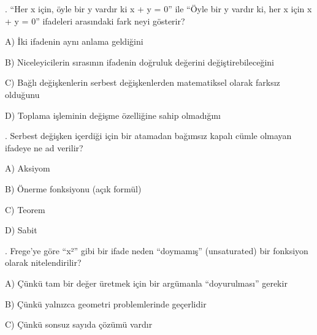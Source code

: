 \par\smallskip{}. “Her x için, öyle bir y vardır ki x + y = 0” ile “Öyle bir y vardır ki, her x için x + y = 0” ifadeleri arasındaki fark neyi gösterir?

\par\noindent\hspace*{1.6em}A) İki ifadenin aynı anlama geldiğini

\par\noindent\hspace*{1.6em}B) Niceleyicilerin sırasının ifadenin doğruluk değerini değiştirebileceğini

\par\noindent\hspace*{1.6em}C) Bağlı değişkenlerin serbest değişkenlerden matematiksel olarak farksız olduğunu

\par\noindent\hspace*{1.6em}D) Toplama işleminin değişme özelliğine sahip olmadığını

\par\smallskip{}. Serbest değişken içerdiği için bir atamadan bağımsız kapalı cümle olmayan ifadeye ne ad verilir?

\par\noindent\hspace*{1.6em}A) Aksiyom

\par\noindent\hspace*{1.6em}B) Önerme fonksiyonu (açık formül)

\par\noindent\hspace*{1.6em}C) Teorem

\par\noindent\hspace*{1.6em}D) Sabit

\par\smallskip{}. Frege’ye göre “x²” gibi bir ifade neden “doymamış” (unsaturated) bir fonksiyon olarak nitelendirilir?

\par\noindent\hspace*{1.6em}A) Çünkü tam bir değer üretmek için bir argümanla “doyurulması” gerekir

\par\noindent\hspace*{1.6em}B) Çünkü yalnızca geometri problemlerinde geçerlidir

\par\noindent\hspace*{1.6em}C) Çünkü sonsuz sayıda çözümü vardır

